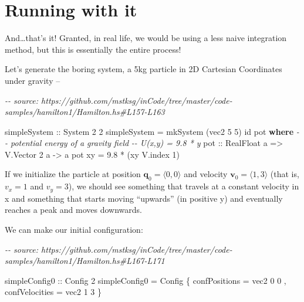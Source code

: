 \documentclass[]{article}
\newenvironment{Shaded}{}{}
\newcommand{\CommentTok}[1]{\textcolor[rgb]{0.38,0.63,0.69}{\textit{#1}}}
\newcommand{\DataTypeTok}[1]{\textcolor[rgb]{0.56,0.13,0.00}{#1}}
\newcommand{\DecValTok}[1]{\textcolor[rgb]{0.25,0.63,0.44}{#1}}
\newcommand{\FloatTok}[1]{\textcolor[rgb]{0.25,0.63,0.44}{#1}}
\newcommand{\FunctionTok}[1]{\textcolor[rgb]{0.02,0.16,0.49}{#1}}
\newcommand{\KeywordTok}[1]{\textcolor[rgb]{0.00,0.44,0.13}{\textbf{#1}}}
\newcommand{\NormalTok}[1]{#1}
\newcommand{\OperatorTok}[1]{\textcolor[rgb]{0.40,0.40,0.40}{#1}}
\newcommand{\OtherTok}[1]{\textcolor[rgb]{0.00,0.44,0.13}{#1}}
\begin{document}
\hypertarget{running-with-it}{%
\section{Running with it}\label{running-with-it}}

And\ldots that's it! Granted, in real life, we would be using a less naive
integration method, but this is essentially the entire process!

Let's generate the boring system, a 5kg particle in 2D Cartesian Coordinates
under gravity --

\begin{Shaded}
\begin{Highlighting}[]
\CommentTok{{-}{-} source: https://github.com/mstksg/inCode/tree/master/code{-}samples/hamilton1/Hamilton.hs\#L157{-}L163}

\OtherTok{simpleSystem ::} \DataTypeTok{System} \DecValTok{2} \DecValTok{2}
\NormalTok{simpleSystem }\OtherTok{=}\NormalTok{ mkSystem (vec2 }\DecValTok{5} \DecValTok{5}\NormalTok{) }\FunctionTok{id}\NormalTok{ pot}
  \KeywordTok{where}
    \CommentTok{{-}{-} potential energy of a gravity field}
    \CommentTok{{-}{-} U(x,y) = 9.8 * y}
\OtherTok{    pot ::} \DataTypeTok{RealFloat}\NormalTok{ a }\OtherTok{=>} \DataTypeTok{V.Vector} \DecValTok{2}\NormalTok{ a }\OtherTok{{-}>}\NormalTok{ a}
\NormalTok{    pot xy }\OtherTok{=} \FloatTok{9.8} \OperatorTok{*}\NormalTok{ (xy }\OtherTok{\textasciigrave{}V.index\textasciigrave{}} \DecValTok{1}\NormalTok{)}
\end{Highlighting}
\end{Shaded}

If we initialize the particle at position
\(\mathbf{q}_0 = \langle 0, 0 \rangle\) and velocity
\(\mathbf{v}_0 = \langle 1, 3 \rangle\) (that is, \(v_x = 1\) and \(v_y = 3\)),
we should see something that travels at a constant velocity in x and something
that starts moving ``upwards'' (in positive y) and eventually reaches a peak and
moves downwards.

We can make our initial configuration:

\begin{Shaded}
\begin{Highlighting}[]
\CommentTok{{-}{-} source: https://github.com/mstksg/inCode/tree/master/code{-}samples/hamilton1/Hamilton.hs\#L167{-}L171}

\OtherTok{simpleConfig0 ::} \DataTypeTok{Config} \DecValTok{2}
\NormalTok{simpleConfig0 }\OtherTok{=} \DataTypeTok{Config}
\NormalTok{    \{ confPositions  }\OtherTok{=}\NormalTok{ vec2 }\DecValTok{0} \DecValTok{0}
\NormalTok{    , confVelocities }\OtherTok{=}\NormalTok{ vec2 }\DecValTok{1} \DecValTok{3}
\NormalTok{    \}}
\end{Highlighting}
\end{Shaded}
\end{document}
